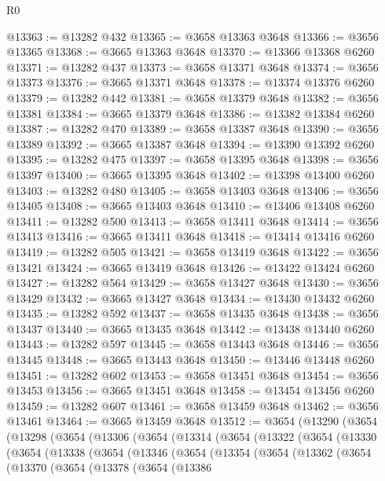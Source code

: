\begin{lexlean}{R0}
\begin{coremodule}
@13363 := @13282 @432
@13365 := @3658 @13363 @3648
@13366 := @3656 @13365
@13368 := @3665 @13363 @3648
@13370 := @13366 @13368 @6260
@13371 := @13282 @437
@13373 := @3658 @13371 @3648
@13374 := @3656 @13373
@13376 := @3665 @13371 @3648
@13378 := @13374 @13376 @6260
@13379 := @13282 @442
@13381 := @3658 @13379 @3648
@13382 := @3656 @13381
@13384 := @3665 @13379 @3648
@13386 := @13382 @13384 @6260
@13387 := @13282 @470
@13389 := @3658 @13387 @3648
@13390 := @3656 @13389
@13392 := @3665 @13387 @3648
@13394 := @13390 @13392 @6260
@13395 := @13282 @475
@13397 := @3658 @13395 @3648
@13398 := @3656 @13397
@13400 := @3665 @13395 @3648
@13402 := @13398 @13400 @6260
@13403 := @13282 @480
@13405 := @3658 @13403 @3648
@13406 := @3656 @13405
@13408 := @3665 @13403 @3648
@13410 := @13406 @13408 @6260
@13411 := @13282 @500
@13413 := @3658 @13411 @3648
@13414 := @3656 @13413
@13416 := @3665 @13411 @3648
@13418 := @13414 @13416 @6260
@13419 := @13282 @505
@13421 := @3658 @13419 @3648
@13422 := @3656 @13421
@13424 := @3665 @13419 @3648
@13426 := @13422 @13424 @6260
@13427 := @13282 @564
@13429 := @3658 @13427 @3648
@13430 := @3656 @13429
@13432 := @3665 @13427 @3648
@13434 := @13430 @13432 @6260
@13435 := @13282 @592
@13437 := @3658 @13435 @3648
@13438 := @3656 @13437
@13440 := @3665 @13435 @3648
@13442 := @13438 @13440 @6260
@13443 := @13282 @597
@13445 := @3658 @13443 @3648
@13446 := @3656 @13445
@13448 := @3665 @13443 @3648
@13450 := @13446 @13448 @6260
@13451 := @13282 @602
@13453 := @3658 @13451 @3648
@13454 := @3656 @13453
@13456 := @3665 @13451 @3648
@13458 := @13454 @13456 @6260
@13459 := @13282 @607
@13461 := @3658 @13459 @3648
@13462 := @3656 @13461
@13464 := @3665 @13459 @3648
@13512 := @3654
    (@13290
      (@3654
        (@13298
          (@3654
            (@13306
              (@3654
                (@13314
                  (@3654
                    (@13322
                      (@3654
                        (@13330
                          (@3654
                            (@13338
                              (@3654
                                (@13346
                                  (@3654
                                    (@13354
                                      (@3654
                                        (@13362
                                          (@3654
                                            (@13370
                                              (@3654
                                                (@13378
                                                  (@3654
                                                    (@13386

\end{coremodule}
\end{lexlean}
